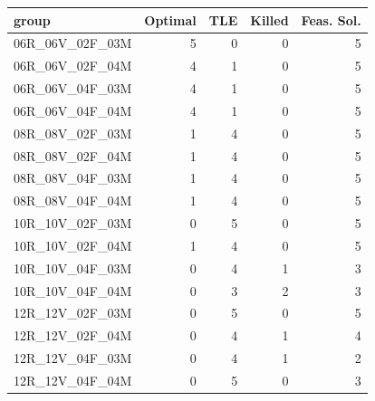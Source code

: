 
\begin{tabular}{lrrrr}
\toprule
group & Optimal & TLE & Killed & Feas. Sol.\\
\midrule
06R\_06V\_02F\_03M & 5 & 0 & 0 & 5\\
06R\_06V\_02F\_04M & 4 & 1 & 0 & 5\\
06R\_06V\_04F\_03M & 4 & 1 & 0 & 5\\
06R\_06V\_04F\_04M & 4 & 1 & 0 & 5\\
08R\_08V\_02F\_03M & 1 & 4 & 0 & 5\\
\addlinespace
08R\_08V\_02F\_04M & 1 & 4 & 0 & 5\\
08R\_08V\_04F\_03M & 1 & 4 & 0 & 5\\
08R\_08V\_04F\_04M & 1 & 4 & 0 & 5\\
10R\_10V\_02F\_03M & 0 & 5 & 0 & 5\\
10R\_10V\_02F\_04M & 1 & 4 & 0 & 5\\
\addlinespace
10R\_10V\_04F\_03M & 0 & 4 & 1 & 3\\
10R\_10V\_04F\_04M & 0 & 3 & 2 & 3\\
12R\_12V\_02F\_03M & 0 & 5 & 0 & 5\\
12R\_12V\_02F\_04M & 0 & 4 & 1 & 4\\
12R\_12V\_04F\_03M & 0 & 4 & 1 & 2\\
\addlinespace
12R\_12V\_04F\_04M & 0 & 5 & 0 & 3\\
\bottomrule
\end{tabular}
